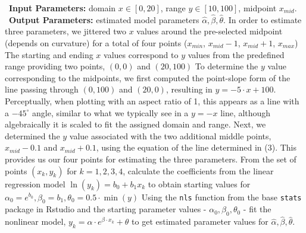 \documentclass[12pt]{article}
\begin{document}
\begin{algorithm}
  \caption{Lineup Parameter Estimation}\label{alg:lineup-parameter-estimation-algorithm}
  \begin{algorithmic}[1]
    \Statex \hspace*{-1em}\textbullet~\textbf{Input Parameters:} domain $x\in[0,20]$, range $y\in[10,100]$, midpoint $x_{mid}$.
    \Statex \hspace*{-1em}\textbullet~\textbf{Output Parameters:} estimated model parameters $\hat\alpha, \hat\beta, \hat\theta$.
    \State In order to estimate three parameters, we jittered two $x$ values around the pre-selected midpoint (depends on curvature) for a total of four points ($x_{min}$, $x_{mid}-1$, $x_{mid}+1$, $x_{max}$)
    \State The starting and ending $x$ values correspond to $y$ values from the predefined range providing two points, $(0,0)$ and $(20,100)$
    \State To determine the $y$ value corresponding to the midpoints, we first computed the point-slope form of the line passing through $(0,100)$ and $(20,0)$, resulting in $y=-5\cdot x+100$. Perceptually, when plotting with an aspect ratio of 1, this appears as a line with a $-45^{\circ}$ angle, similar to what we typically see in a $y=-x$ line, although algebraically it is scaled to fit the assigned domain and range.
    \State Next, we determined the $y$ value associated with the two additional middle points, $x_{mid} - 0.1$ and $x_{mid} + 0.1$, using the equation of the line determined in (3). This provides us our four points for estimating the three parameters.
    \State From the set of points $(x_k, y_k)$ for $k = 1,2,3,4$, calculate the coefficients from the linear regression model $\ln(y_k) = b_0 +b_1x_k$ to obtain starting values for $\alpha_0 = e^{b_0}, \beta_0 =  b_1, \theta_0 = 0.5\cdot \min(y)$
    \State Using the \texttt{nls} function from the base \texttt{stats} package in Rstudio \citep{Rstudio} and the starting parameter values - $\alpha_0, \beta_0, \theta_0$ - fit the nonlinear model, $y_k = \alpha\cdot e^{\beta\cdot x_k}+\theta$ to get estimated parameter values for $\hat\alpha, \hat\beta, \hat\theta.$
  \end{algorithmic}
\end{algorithm}
\end{document}
